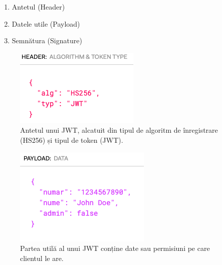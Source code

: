 \documentclass[12pt]{article}
\begin{document}
\begin{enumerate}
    \item Antetul (Header)
    \item Datele utile (Payload)
    \item Semnătura (Signature)
\end{enumerate}


\begin{figure}[H]
    \begin{minipage}[c]{0.5\textwidth}
        \includegraphics[width=\textwidth]{jwt-header.png}
    \end{minipage}\hfill
    \begin{minipage}[c]{0.5\textwidth}
        \caption{Antetul unui JWT, alcatuit din tipul de algoritm 
        de înregistrare (HS256) și tipul de token (JWT).}
    \end{minipage}
\end{figure}

\begin{figure}[H]
    \begin{minipage}[c]{0.5\textwidth}
        \includegraphics[width=\textwidth]{jwt-payload.png}
    \end{minipage}\hfill
    \begin{minipage}[c]{0.5\textwidth}
        \caption{Partea utilă al unui JWT conține date sau permisiuni
        pe care clientul le are.}
    \end{minipage}
\end{figure}
\end{document}
